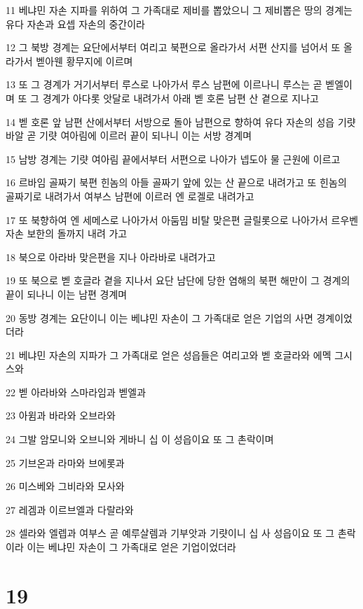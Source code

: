 \par 11 베냐민 자손 지파를 위하여 그 가족대로 제비를 뽑았으니 그 제비뽑은 땅의 경계는 유다 자손과 요셉 자손의 중간이라
\par 12 그 북방 경계는 요단에서부터 여리고 북편으로 올라가서 서편 산지를 넘어서 또 올라가서 벧아웬 황무지에 이르며
\par 13 또 그 경계가 거기서부터 루스로 나아가서 루스 남편에 이르나니 루스는 곧 벧엘이며 또 그 경계가 아다롯 앗달로 내려가서 아래 벧 호론 남편 산 곁으로 지나고
\par 14 벧 호론 앞 남편 산에서부터 서방으로 돌아 남편으로 향하여 유다 자손의 성읍 기럇바알 곧 기럇 여아림에 이르러 끝이 되나니 이는 서방 경계며
\par 15 남방 경계는 기럇 여아림 끝에서부터 서편으로 나아가 넵도아 물 근원에 이르고
\par 16 르바임 골짜기 북편 힌놈의 아들 골짜기 앞에 있는 산 끝으로 내려가고 또 힌놈의 골짜기로 내려가서 여부스 남편에 이르러 엔 로겔로 내려가고
\par 17 또 북향하여 엔 세메스로 나아가서 아둠밈 비탈 맞은편 글릴롯으로 나아가서 르우벤 자손 보한의 돌까지 내려 가고
\par 18 북으로 아라바 맞은편을 지나 아라바로 내려가고
\par 19 또 북으로 벧 호글라 곁을 지나서 요단 남단에 당한 염해의 북편 해만이 그 경계의 끝이 되나니 이는 남편 경계며
\par 20 동방 경계는 요단이니 이는 베냐민 자손이 그 가족대로 얻은 기업의 사면 경계이었더라
\par 21 베냐민 자손의 지파가 그 가족대로 얻은 성읍들은 여리고와 벧 호글라와 에멕 그시스와
\par 22 벧 아라바와 스마라임과 벧엘과
\par 23 아윔과 바라와 오브라와
\par 24 그발 암모니와 오브니와 게바니 십 이 성읍이요 또 그 촌락이며
\par 25 기브온과 라마와 브에롯과
\par 26 미스베와 그비라와 모사와
\par 27 레겜과 이르브엘과 다랄라와
\par 28 셀라와 엘렙과 여부스 곧 예루살렘과 기부앗과 기럇이니 십 사 성읍이요 또 그 촌락이라 이는 베냐민 자손이 그 가족대로 얻은 기업이었더라

\chapter{19}

